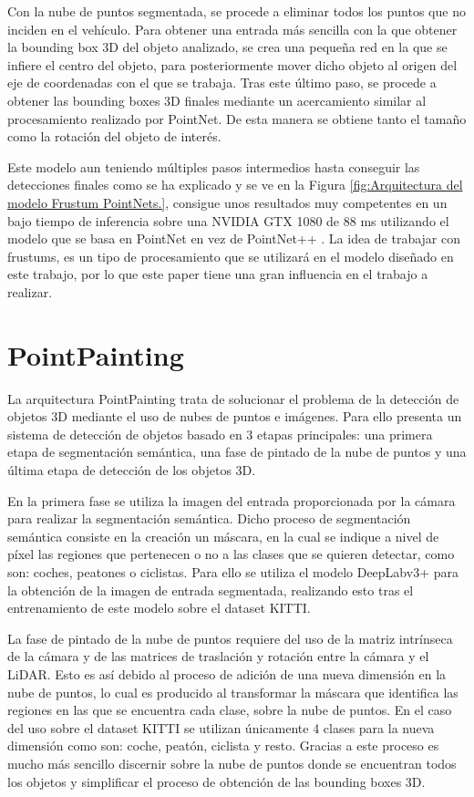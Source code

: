Con la nube de puntos segmentada, se procede a eliminar todos los puntos que no inciden en el vehículo. Para obtener una entrada más sencilla con la que obtener la bounding box 3D del objeto analizado, se crea una pequeña red en la que se infiere el centro del objeto, para posteriormente mover dicho objeto al origen del eje de coordenadas con el que se trabaja. Tras este último paso, se procede a obtener las bounding boxes 3D finales mediante un acercamiento similar al procesamiento realizado por PointNet. De esta manera se obtiene tanto el tamaño como la rotación del objeto de interés.

Este modelo aun teniendo múltiples pasos intermedios hasta conseguir las detecciones finales como se ha explicado y se ve en la Figura \ref{fig:Arquitectura del modelo Frustum PointNets.}, consigue unos resultados muy competentes en un bajo tiempo de inferencia sobre una NVIDIA GTX 1080 de 88 ms utilizando el modelo que se basa en PointNet en vez de PointNet++ \cite{PointNet++}. La idea de trabajar con frustums, es un tipo de procesamiento que se utilizará en el modelo diseñado en este trabajo, por lo que este paper tiene una gran influencia en el trabajo a realizar.

\section{PointPainting}
\label{sec:PointPainting}

La arquitectura PointPainting \cite{PointPainting} trata de solucionar el problema de la detección de objetos 3D mediante el uso de nubes de puntos e imágenes. Para ello presenta un sistema de detección de objetos basado en 3 etapas principales: una primera etapa de segmentación semántica, una fase de pintado de la nube de puntos y una última etapa de detección de los objetos 3D.

En la primera fase se utiliza la imagen del entrada proporcionada por la cámara para realizar la segmentación semántica. Dicho proceso de segmentación semántica consiste en la creación un máscara, en la cual se indique a nivel de píxel las regiones que pertenecen o no a las clases que se quieren detectar, como son: coches, peatones o ciclistas. Para ello se utiliza el modelo DeepLabv3+ \cite{DeepLabv3+} para la obtención de la imagen de entrada segmentada, realizando esto tras el entrenamiento de este modelo sobre el dataset KITTI.

La fase de pintado de la nube de puntos requiere del uso de la matriz intrínseca de la cámara y de las matrices de traslación y rotación entre la cámara y el \ac{LiDAR}. Esto es así debido al proceso de adición de una nueva dimensión en la nube de puntos, lo cual es producido al transformar la máscara que identifica las regiones en las que se encuentra cada clase, sobre la nube de puntos. En el caso del uso sobre el dataset KITTI se utilizan únicamente 4 clases para la nueva dimensión como son: coche, peatón, ciclista y resto. Gracias a este proceso es mucho más sencillo discernir sobre la nube de puntos donde se encuentran todos los objetos y simplificar el proceso de obtención de las bounding boxes 3D.

